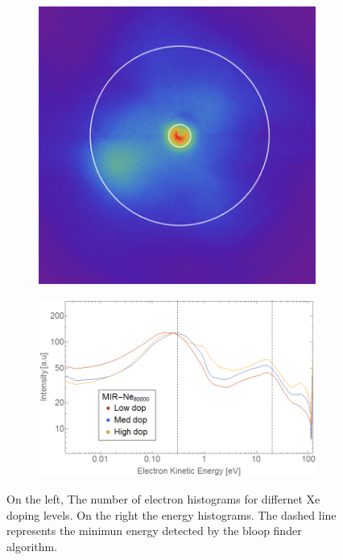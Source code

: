  
\begin{figure}[h!]
\hfill
\begin{subfigure}[l]{0.48\textwidth}
\includegraphics[width=1\textwidth]{../Images/results/Comparison_energyDistribution/MIR_Ne_37K.png} 
\end{subfigure} 
\begin{subfigure}[l]{0.48\textwidth}
\includegraphics[width=1\textwidth]{../Images/results/Comparison_energyDistribution/MIR_Ne_summed_energydist.png} 
\end{subfigure} \hfill
\caption[MIR Ne-Xe doping scan.Histograms]{On the left, The number of electron histograms for differnet Xe doping levels. On the right the energy histograms. The dashed line represents the minimun energy detected by the bloop finder algorithm.}
\label{fig:Neonenegdis}
\end{figure}


